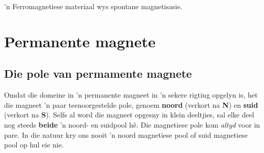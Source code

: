 'n Ferromagnetiese materiaal wys spontane magnetisasie.\par


\section*{Permanente magnete}
            \nopagebreak
      \label{m37830*uid16}
\subsection{Die pole van permamente magnete}

\nopagebreak
Omdat die domeine in 'n permanente magneet in 'n sekere rigting opgelyn is, het die magneet 'n paar teenoorgestelde pole, genoem \textbf{noord} (verkort na \textbf{N}) en \textbf{suid} (verkort na \textbf{S}). Selfs al word die magneet opgesny in klein deeltjies, sal elke deel nog steeds \textbf{beide} 'n noord- en suidpool h\^e. Die magnetiese pole kom \textsl{altyd} voor in pare. In die natuur kry ons nooit 'n noord magnetiese pool of suid magnetiese pool op hul eie nie.
        
